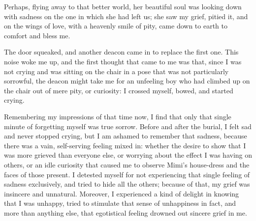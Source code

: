 Perhaps, flying away to that better world, her beautiful soul was looking down with sadness on the one in which she had left us; she saw my grief, pitied it, and on the wings of love, with a heavenly smile of pity, came down to earth to comfort and bless me.

The door squeaked, and another deacon came in to replace the first one. This noise woke me up, and the first thought that came to me was that, since I was not crying and was sitting on the chair in a pose that was not particularly sorrowful, the deacon might take me for an unfeeling boy who had climbed up on the chair out of mere pity, or curiosity: I crossed myself, bowed, and started crying.

Remembering my impressions of that time now, I find that only that single minute of forgetting myself was true sorrow. Before and after the burial, I felt sad and never stopped crying, but I am ashamed to remember that sadness, because there was a vain, self-serving feeling mixed in: whether the desire to show that I was more grieved than everyone else, or worrying about the effect I was having on others, or an idle curiosity that caused me to observe Mimi's house-dress and the faces of those present. I detested myself for not experiencing that single feeling of sadness exclusively, and tried to hide all the others; because of that, my grief was insincere and unnatural. Moreover, I experienced a kind of delight in knowing that I was unhappy, tried to stimulate that sense of unhappiness in fact, and more than anything else, that egotistical feeling drowned out sincere grief in me.

